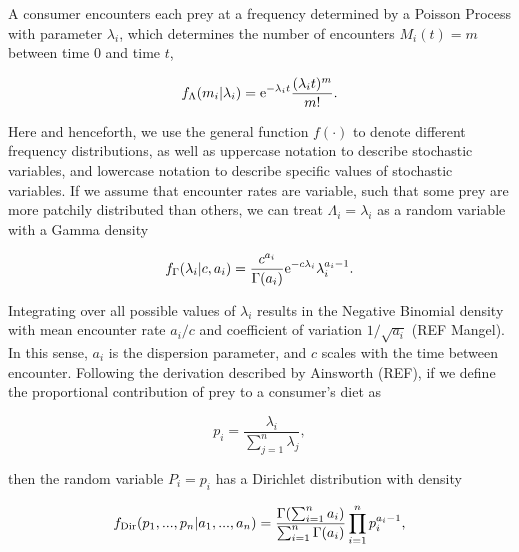 \documentclass[11pt]{article}
\begin{document}
A consumer encounters each prey at a frequency determined by a Poisson Process with parameter $\lambda_i$, which determines the number of encounters $M_i(t)=m$ between time 0 and time $t$,

\begin{equation}
f_\Lambda (m_i|\lambda_i) = {\rm e}^{-\lambda_i t}\frac{(\lambda_i t)^m}{m!}.
\end{equation}

\noindent Here and henceforth, we use the general function $f(\cdot)$ to denote different frequency distributions, as well as uppercase notation to describe stochastic variables, and lowercase notation to describe specific values of stochastic variables.
If we assume that encounter rates are variable, such that some prey are more patchily distributed than others, we can treat $\Lambda_i = \lambda_i$ as a random variable with a Gamma density

\begin{equation}
f_\Gamma (\lambda_i | c, a_i) = \frac{c^{a_i}}{\Gamma (a_i)}{\rm e}^{-c \lambda_i}\lambda_i^{a_i - 1}.
\end{equation}

\noindent Integrating over all possible values of $\lambda_i$ results in the Negative Binomial density with mean encounter rate $a_i/c$ and coefficient of variation $1/\sqrt{a_i}$ (REF Mangel).
In this sense, $a_i$ is the dispersion parameter, and $c$ scales with the time between encounter.
Following the derivation described by Ainsworth (REF), if we define the proportional contribution of prey to a consumer's diet as

\begin{equation}
  p_i = \frac{\lambda_i}{\sum_{j=1}^n \lambda_j},
\end{equation}

\noindent then the random variable $P_i = p_i$ has a Dirichlet distribution with density

\begin{equation}
  f_{\rm Dir}(p_1,...,p_n|a_1,...,a_n) = \frac{\Gamma(\sum_{i=1}^n a_i)}{\sum_{i=1}^n\Gamma(a_i)}\prod_{i=1}^n p_i^{a_i - 1},
\end{equation}
\end{document}

